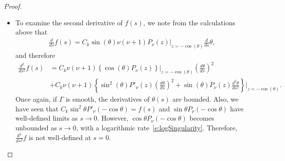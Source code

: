 \documentclass[final]{siamltex}
\renewcommand{\S} {\mathcal{S}}
\begin{document}
\begin{proof}
\begin{itemize}
  \item To examine the second derivative of $f(s)$, we note from the
  calculations above that
  \begin{align*}
    \frac{d}{ds}f(s) =  C_{k}\sin(\theta) \nu(\nu+1)
    P_\nu(z)\vert_{z=-\cos(\theta)} \frac{d}{ds}\theta,
  \end{align*}
  and therefore
  \begin{align*}
    \frac{d^2}{ds^2}f(s) &=  C_{k}\nu(\nu+1)\left\{
    \cos(\theta) P_\nu(z)
    \right\}\vert_{z=-\cos(\theta)}(\frac{d\theta}{ds})^2 \\
    &+ C_{k}\nu(\nu+1)\left\{\sin^2(\theta) P'_{\nu}(z) 
      (\frac{d\theta}{ds})^2 + \sin(\theta)P_\nu(z) 
      \frac{d^2 \theta}{ds^2}\right\}\vert_{z=-\cos(\theta)}.
  \end{align*}
  Once again, if $\Gamma$ is smooth, the derivatives of $\theta(s)$ are
  bounded. Also, we have seen that $C_{k}\sin^{2} \theta
  P'_{\nu}(-\cos\theta) = f(s)$ and $\sin \theta P_{\nu}(-\cos \theta)$
  have well-defined limits as $s\rightarrow 0$. However, $ \cos \theta
  P_{\nu}(-\cos \theta)$ becomes unbounded as $s\rightarrow 0$, with a
  logarithmic rate~\eqref{e:logSingularity}.  Therefore,
  $\frac{d^2}{ds^2}f$ is not well-defined at $s=0$.

\end{itemize}

\end{proof}




%
\end{document}

